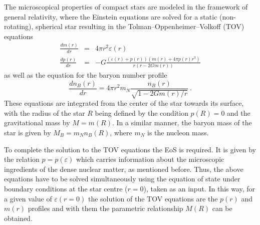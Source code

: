 {The microscopical properties of compact stars are modeled
in the framework of general relativity, where the Einstein equations
are solved for a static (non-rotating), spherical star resulting in
the Tolman--Oppenheimer--Volkoff (TOV) equations \cite{Tolman:1939jz,Oppenheimer:1939ne,Glendenning:1997wn}
\begin{eqnarray}
\frac{dm(r)}{dr} & = & 4\pi r^{2}\varepsilon(r)\\
\frac{dp(r)}{dr} & = & -G\frac{(\varepsilon(r)+p(r))(m(r)+4\pi p(r)r^{3})}{r(r-2Gm(r))}\label{TOV1}
\end{eqnarray}
as well as the equation for the baryon number profile
\begin{equation}
\frac{dn_{B}(r)}{dr}=4\pi r^{2}m_{N}\frac{n_{B}(r)}{\sqrt{1-2Gm(r)/r}}~.
\end{equation}
These equations are integrated from the center of the star towards
its surface, with the radius of the star $R$ being defined by the
condition $p(R)=0$ and the gravitational mass by $M=m(R)$. In a
similar manner, the baryon mass of the star is given by $M_{B}=m_{N}n_{B}(R)$,
where $m_{N}$ is the nucleon mass.}

{To complete the solution to the TOV equations the EoS is required.
It is given by the relation $p=p(\varepsilon)$ which carries information
about the microscopic ingredients of the dense nuclear matter, as
mentioned before. Thus, the above equations have to be solved simultaneously
using the equation of state under boundary conditions at the star
centre ($r=0$), taken as an input. In this way, for a given value
of $\varepsilon(r=0)$ the solution of the TOV equations are the $p(r)$
and $m(r)$ profiles and with them the parametric relationship $M(R)$
can be obtained.}

